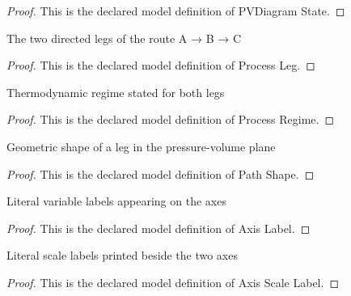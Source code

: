 \begin{proof}
  This is the declared model definition of PVDiagram State.
\end{proof}
\begin{definition}
  \label{def:physics:phyx-mini-0358:phyxminiproblems-problemphyxmini0358-processleg}
  The two directed legs of the route A → B → C
\end{definition}
\begin{proof}
  This is the declared model definition of Process Leg.
\end{proof}
\begin{definition}
  \label{def:physics:phyx-mini-0358:phyxminiproblems-problemphyxmini0358-processregime}
  Thermodynamic regime stated for both legs
\end{definition}
\begin{proof}
  This is the declared model definition of Process Regime.
\end{proof}
\begin{definition}
  \label{def:physics:phyx-mini-0358:phyxminiproblems-problemphyxmini0358-pathshape}
  Geometric shape of a leg in the pressure-volume plane
\end{definition}
\begin{proof}
  This is the declared model definition of Path Shape.
\end{proof}
\begin{definition}
  \label{def:physics:phyx-mini-0358:phyxminiproblems-problemphyxmini0358-axislabel}
  Literal variable labels appearing on the axes
\end{definition}
\begin{proof}
  This is the declared model definition of Axis Label.
\end{proof}
\begin{definition}
  \label{def:physics:phyx-mini-0358:phyxminiproblems-problemphyxmini0358-axisscalelabel}
  Literal scale labels printed beside the two axes
\end{definition}
\begin{proof}
  This is the declared model definition of Axis Scale Label.
\end{proof}

